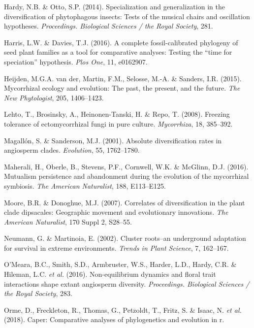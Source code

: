 \documentclass[12pt,]{article}
\begin{document}
\leavevmode\hypertarget{ref-hardy_2014}{}%
Hardy, N.B. \& Otto, S.P. (2014). Specialization and generalization in
the diversification of phytophagous insects: Tests of the musical chairs
and oscillation hypotheses. \emph{Proceedings. Biological Sciences / the
Royal Society}, 281.

\leavevmode\hypertarget{ref-Harris_Davies_2016}{}%
Harris, L.W. \& Davies, T.J. (2016). A complete fossil-calibrated
phylogeny of seed plant families as a tool for comparative analyses:
Testing the ``time for speciation'' hypothesis. \emph{Plos One}, 11,
e0162907.

\leavevmode\hypertarget{ref-vanderheijden_2015}{}%
Heijden, M.G.A. van der, Martin, F.M., Selosse, M.-A. \& Sanders, I.R.
(2015). Mycorrhizal ecology and evolution: The past, the present, and
the future. \emph{The New Phytologist}, 205, 1406--1423.

\leavevmode\hypertarget{ref-lehto_2008}{}%
Lehto, T., Brosinsky, A., Heinonen-Tanski, H. \& Repo, T. (2008).
Freezing tolerance of ectomycorrhizal fungi in pure culture.
\emph{Mycorrhiza}, 18, 385--392.

\leavevmode\hypertarget{ref-magalln_2001}{}%
Magallón, S. \& Sanderson, M.J. (2001). Absolute diversification rates
in angiosperm clades. \emph{Evolution}, 55, 1762--1780.

\leavevmode\hypertarget{ref-maherali_2016}{}%
Maherali, H., Oberle, B., Stevens, P.F., Cornwell, W.K. \& McGlinn, D.J.
(2016). Mutualism persistence and abandonment during the evolution of
the mycorrhizal symbiosis. \emph{The American Naturalist}, 188,
E113--E125.

\leavevmode\hypertarget{ref-moore_2007}{}%
Moore, B.R. \& Donoghue, M.J. (2007). Correlates of diversification in
the plant clade dipsacales: Geographic movement and evolutionary
innovations. \emph{The American Naturalist}, 170 Suppl 2, S28--55.

\leavevmode\hypertarget{ref-neumann_2002}{}%
Neumann, G. \& Martinoia, E. (2002). Cluster roots--an underground
adaptation for survival in extreme environments. \emph{Trends in Plant
Science}, 7, 162--167.

\leavevmode\hypertarget{ref-omeara_2016}{}%
O'Meara, B.C., Smith, S.D., Armbruster, W.S., Harder, L.D., Hardy, C.R.
\& Hileman, L.C. \emph{et al.} (2016). Non-equilibrium dynamics and
floral trait interactions shape extant angiosperm diversity.
\emph{Proceedings. Biological Sciences / the Royal Society}, 283.

\leavevmode\hypertarget{ref-orme_software_2018}{}%
Orme, D., Freckleton, R., Thomas, G., Petzoldt, T., Fritz, S. \& Isaac,
N. \emph{et al.} (2018). Caper: Comparative analyses of phylogenetics
and evolution in r.
\end{document}
